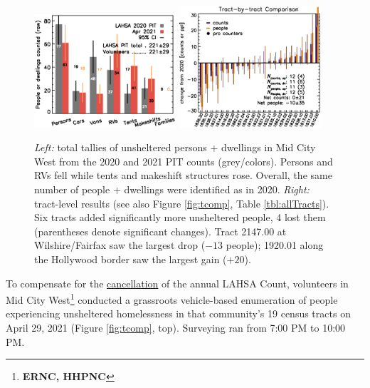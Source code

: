 \documentclass[11pt]{article}
\def\bfr{\bf\color{red}}
\begin{document}
\begin{figure}[h]
	\centering
	\includegraphics[width = 0.47\textwidth, trim = 1cm 0cm 0cm 1cm]{bars}
	\includegraphics[width = 0.47\textwidth, trim = 0cm 0cm 0cm 1cm]{tractsYrYr.eps}	
	\caption{{\it Left:} total tallies of unsheltered persons + dwellings in Mid City West from 
			the 2020 and 2021 PIT counts (grey/colors). Persons and RVs fell while 
			tents and makeshift structures rose. Overall, the same number of 
			people + dwellings were identified as in 2020. {\it Right:} tract-level
			results (see also Figure \ref{fig:tcomp}, Table \ref{tbl:allTracts}). Six tracts added 
			significantly more unsheltered people, 4 lost them (parentheses
			denote significant changes). Tract 2147.00 at Wilshire/Fairfax saw the largest 
			drop ($-13$ people); 1920.01 along the Hollywood border saw the largest 
			gain ($+20$).}
	\label{fig:rawCounts}
\end{figure}


 To compensate for the 
\href{https://laist.com/latest/post/20201209/LAHSA-cancels-2021-homeless-count-los-angeles-covid-19}
{cancellation} of the annual LAHSA Count, volunteers in Mid City 
West\footnote{{\bfr ERNC, HHPNC}} conducted a grassroots 
vehicle-based enumeration of people experiencing unsheltered homelessness in that community's 
19 census tracts on April 29, 2021 (Figure \ref{fig:tcomp}, top). Surveying ran from 7:00 PM to 
10:00 PM.\\
\end{document}

